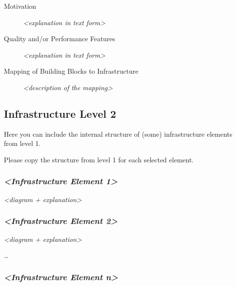 \documentclass[
]{article}
\begin{document}
\begin{description}
\item[Motivation]
\emph{\textless explanation in text form\textgreater{}}
\item[Quality and/or Performance Features]
\emph{\textless explanation in text form\textgreater{}}
\item[Mapping of Building Blocks to Infrastructure]
\emph{\textless description of the mapping\textgreater{}}
\end{description}

\hypertarget{_infrastructure_level_2}{%
\subsection{Infrastructure Level 2}\label{_infrastructure_level_2}}

Here you can include the internal structure of (some) infrastructure
elements from level 1.

Please copy the structure from level 1 for each selected element.

\hypertarget{__emphasis_infrastructure_element_1_emphasis}{%
\subsubsection{\texorpdfstring{\emph{\textless Infrastructure Element
1\textgreater{}}}{\textless Infrastructure Element 1\textgreater{}}}\label{__emphasis_infrastructure_element_1_emphasis}}

\emph{\textless diagram + explanation\textgreater{}}

\hypertarget{__emphasis_infrastructure_element_2_emphasis}{%
\subsubsection{\texorpdfstring{\emph{\textless Infrastructure Element
2\textgreater{}}}{\textless Infrastructure Element 2\textgreater{}}}\label{__emphasis_infrastructure_element_2_emphasis}}

\emph{\textless diagram + explanation\textgreater{}}

\ldots{}

\hypertarget{__emphasis_infrastructure_element_n_emphasis}{%
\subsubsection{\texorpdfstring{\emph{\textless Infrastructure Element
n\textgreater{}}}{\textless Infrastructure Element n\textgreater{}}}\label{__emphasis_infrastructure_element_n_emphasis}}
\end{document}
